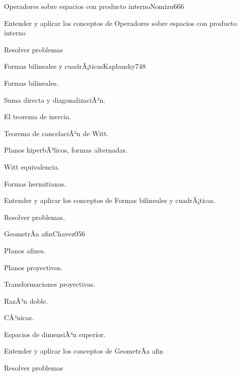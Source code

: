 \begin{syllabus}
\begin{unit}{Operadores sobre espacios con producto interno}{Nomizu66}{6}
   \begin{unitgoals}
         \item  Entender y aplicar los conceptos de Operadores sobre espacios con producto interno
         \item  Resolver problemas
   \end{unitgoals}
\end{unit}

\begin{unit}{Formas bilineales y cuadrÃ¡ticas}{Kaplansky74}{8}
   \begin{topics}
	\item Formas bilineales.
	\item Suma directa y diagonalizaciÃ³n.
	\item El teorema de inercia.
	\item Teorema de cancelaciÃ³n de Witt.
	\item Planos hiperbÃ³licos, formas alternadas.
	\item Witt equivalencia.
	\item Formas hermitianas.
   \end{topics}

   \begin{unitgoals}
         \item Entender y aplicar los conceptos de Formas bilineales y cuadrÃ¡ticas.
         \item Resolver problemas.
   \end{unitgoals}
\end{unit}

\begin{unit}{GeometrÃ­a afin}{Chavez05}{6}
   \begin{topics}
         \item  Planos afines.
	 \item  Planos proyectivos.
         \item  Transformaciones proyectivas.
	 \item  RazÃ³n doble.
         \item  CÃ³nicas.
         \item  Espacios de dimensiÃ³n superior.
   \end{topics}

   \begin{unitgoals}
         \item  Entender y aplicar los conceptos de GeometrÃ­a afin
         \item  Resolver problemas
   \end{unitgoals}
\end{unit}

\begin{coursebibliography}
\end{coursebibliography}

\end{syllabus}
